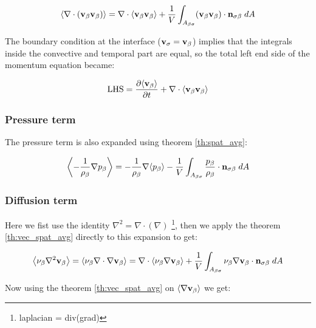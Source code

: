 \begin{equation}
{\left< \nabla \cdot (\textbf{v}_{\beta}\textbf{v}_{\beta}) \right>} = \nabla \cdot {\left< \textbf{v}_{\beta}\textbf{v}_{\beta}\right>} + \dfrac{1}{V} \int_{A_{\beta \sigma}}  (\textbf{v}_{\beta} \textbf{v}_{\beta}) \cdot \mathbf{n}_{\sigma \beta} \;dA
\end{equation}

The boundary condition at the interface ($\textbf{v}_{\sigma} = \textbf{v}_{\beta}$) implies that the integrals inside the convective and temporal part are equal, so the total left end side of the momentum equation became:

\begin{equation}
\text{LHS} = \dfrac{\partial {\left< \textbf{v}_{\beta}\right>}}{\partial t} + \nabla \cdot {\left< \textbf{v}_{\beta}\textbf{v}_{\beta}\right>}
\label{eq:lhs}
\end{equation}

\subsubsection{Pressure term}
The pressure term is also expanded using theorem \ref{th:spat_avg}:

\begin{equation}
{\left< -\dfrac{1}{\rho_{\beta}} \nabla p_{\beta}\right>} = -\dfrac{1}{\rho_{\beta}} \nabla {\left< p_{\beta}\right>} -\dfrac{1}{V} \int_{A_{\beta \sigma}}  \dfrac{p_{\beta}}{\rho_{\beta}}  \cdot \mathbf{n}_{\sigma \beta} \;dA
\end{equation}

\subsubsection{Diffusion term}
Here we fist use the identity $\nabla^2 = \nabla \cdot (\nabla)$ \footnote{laplacian = div(grad)}, then we apply the theorem \ref{th:vec_spat_avg} directly to this expansion to get:

\begin{equation}
{\left< \nu_{\beta}\nabla^2 \textbf{v}_{\beta}\right>} = {\left< \nu_{\beta}\nabla \cdot \nabla \textbf{v}_{\beta} \right>} = \nabla \cdot {\left< \nu_{\beta}\nabla \textbf{v}_{\beta}\right>} +\dfrac{1}{V} \int_{A_{\beta \sigma}}  \nu_{\beta} \nabla \textbf{v}_{\beta} \cdot \mathbf{n}_{\sigma \beta} \;dA
\label{eq:4_1}
\end{equation}

Now using the theorem \ref{th:vec_spat_avg} on ${\left< \nabla \textbf{v}_{\beta} \right>}$ we get:

